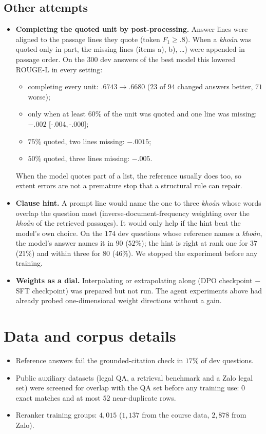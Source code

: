 \documentclass[11pt,a4paper]{article}
\newcommand{\rl}{ROUGE-L}
\newcommand{\ci}[2]{{\scriptsize[#1,\,#2]}}
\begin{document}
\subsection{Other attempts}
\begin{itemize}[leftmargin=*]
\item \textbf{Completing the quoted unit by post-processing.} Answer lines were aligned to the passage lines they quote (token $F_1\ge.8$). When a \textit{khoản} was quoted only in part, the missing lines (items a), b), \ldots) were appended in passage order. On the $300$ dev answers of the best model this lowered \rl{} in every setting:
  \begin{itemize}[leftmargin=*]
  \item completing every unit: $.6743\to.6680$ ($23$ of $94$ changed answers better, $71$ worse);
  \item only when at least $60\%$ of the unit was quoted and one line was missing: $-.002$ \ci{-.004}{-.000};
  \item $75\%$ quoted, two lines missing: $-.0015$;
  \item $50\%$ quoted, three lines missing: $-.005$.
  \end{itemize}
  When the model quotes part of a list, the reference usually does too, so extent errors are not a premature stop that a structural rule can repair.
\item \textbf{Clause hint.} A prompt line would name the one to three \textit{khoản} whose words overlap the question most (inverse-document-frequency weighting over the \textit{khoản} of the retrieved passages). It would only help if the hint beat the model's own choice. On the $174$ dev questions whose reference names a \textit{khoản}, the model's answer names it in $90$ ($52\%$); the hint is right at rank one for $37$ ($21\%$) and within three for $80$ ($46\%$). We stopped the experiment before any training.
\item \textbf{Weights as a dial.} Interpolating or extrapolating along (DPO checkpoint $-$ SFT checkpoint) was prepared but not run. The agent experiments above had already probed one-dimensional weight directions without a gain.
\end{itemize}

\section{Data and corpus details}\label{app:data}
\begin{itemize}[leftmargin=*]
\item Reference answers fail the grounded-citation check in $17\%$ of dev questions.
\item Public auxiliary datasets (legal QA, a retrieval benchmark and a Zalo legal set) were screened for overlap with the QA set before any training use: $0$ exact matches and at most $52$ near-duplicate rows.
\item Reranker training groups: $4{,}015$ ($1{,}137$ from the course data, $2{,}878$ from Zalo).
\end{itemize}
\end{document}
